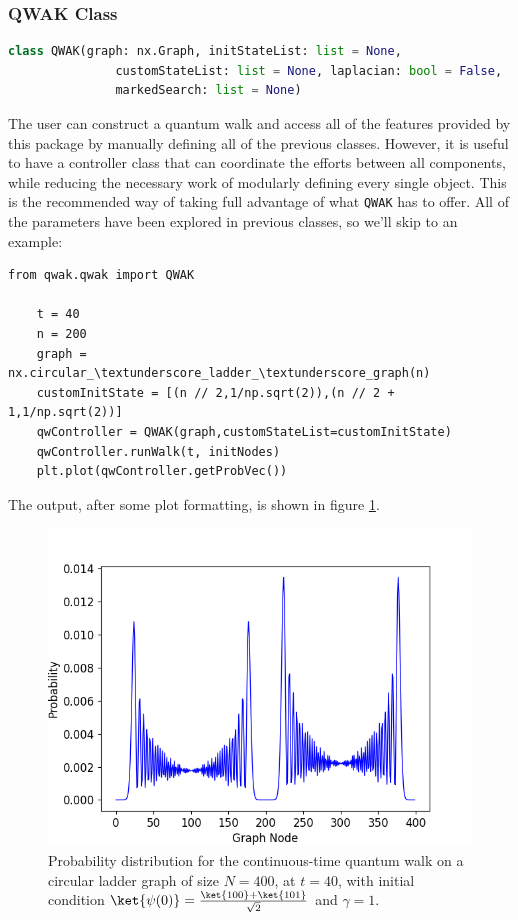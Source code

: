 \documentclass[../../dissertation.tex]{subfiles}
\begin{document}
\subsubsection{QWAK Class}
\begin{lstlisting}[style=commands,language=Python,mathescape]
    class QWAK(graph: nx.Graph, initStateList: list = None, 
               customStateList: list = None, laplacian: bool = False, 
               markedSearch: list = None)
\end{lstlisting}
The user can construct a quantum walk and access all of the features
provided by this package by manually defining all of the previous classes.
However, it is useful to have a controller class that can coordinate the
efforts between all components, while reducing the necessary work of
modularly defining every single object. This is the recommended way of taking
full advantage of what \texttt{QWAK} has to offer. All of the parameters have
been explored in previous classes, so we'll skip to an example:
\begin{lstlisting}[style=code,escapeinside={__}]
    from qwak.qwak import QWAK

    t = 40
    n = 200
    graph = nx.circular_\textunderscore_ladder_\textunderscore_graph(n)
    customInitState = [(n // 2,1/np.sqrt(2)),(n // 2 + 1,1/np.sqrt(2))]
    qwController = QWAK(graph,customStateList=customInitState)
    qwController.runWalk(t, initNodes)
    plt.plot(qwController.getProbVec())
\end{lstlisting}
The output, after some plot formatting, is shown in figure
\ref{fig:probDistCircLadder}.
\begin{figure}[!h]
    \centering
    \includegraphics[scale=0.50]{img/QWAK/probDistCircLadder.png}
    \caption{Probability distribution for the continuous-time quantum walk on a circular ladder graph of size $N=400$, at $t=40$, with initial condition $\ket{\psi(0)}=\frac{\ket{100}+\ket{101}}{\sqrt{2}}$ and $\gamma=1$.} 
    \label{fig:probDistCircLadder}
\end{figure}
\end{document}
